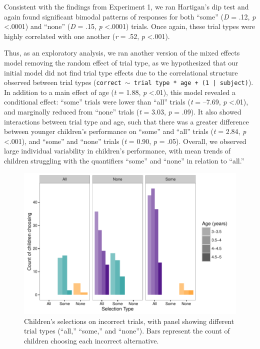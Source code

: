 \documentclass[man]{apa2}
\begin{document}
Consistent with the findings from Experiment 1, we ran Hartigan's dip test and again found significant bimodal patterns of responses for both ``some'' (\textit{D} = .12, \textit{p} \textless  .0001) and ``none'' (\textit{D} = .15, \textit{p} \textless  .0001) trials. Once again, these trial types were highly correlated with one another (\textit{r} = .52, \textit{p} \textless  .001).

Thus, as an exploratory analysis, we ran another version of the mixed effects model removing the random effect of trial type, as we hypothesized that our initial model did not find trial type effects due to the correlational structure observed between trial types ({\tt{correct $\sim$ trial type * age + (1 | subject)}}). In addition to a main effect of age (\textit{t} = 1.88, \textit{p} \textless .01), this model revealed a conditional effect: ``some'' trials were lower than ``all'' trials (\textit{t} = --7.69, \textit{p} \textless  .01), and marginally reduced from ``none'' trials (\textit{t} = 3.03, \textit{p} = .09). It also showed interactions between trial type and age, such that there was a greater difference between younger children's performance on ``some'' and ``all'' trials (\textit{t} = 2.84, \textit{p} \textless  .001), and ``some'' and ``none'' trials (\textit{t} = 0.90, \textit{p} = .05). Overall, we observed large individual variability in children's performance, with mean trends of children struggling with the quantifiers ``some'' and ``none'' in relation to ``all.''

\begin{figure}
 \begin{center}
  \includegraphics[width=6in]{figures/exp2_wrong.pdf}
  \caption{\label{fig:exp2_wrong} Children's selections on incorrect trials, with panel showing different trial types (``all,'' ``some,'' and ``none''). Bars represent the count of children choosing each incorrect alternative.}
 \end{center}
\end{figure}
\end{document}
